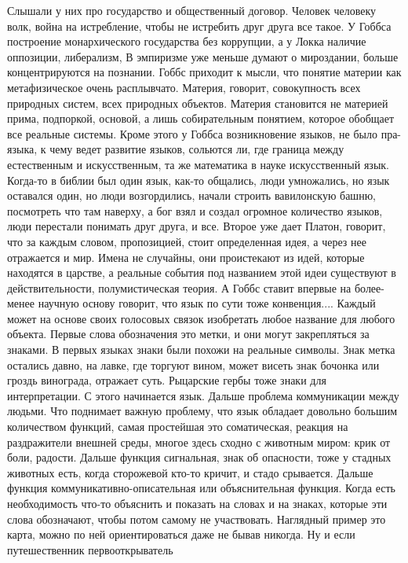 \documentclass[a4paper, 12pt]{article}
\begin{document}
Слышали у них про государство и общественный договор. Человек человеку 
волк, война на истребление, чтобы не истребить друг друга все такое. 
У Гоббса построение монархического государства без коррупции, а у Локка 
наличие оппозиции, либерализм, В эмпиризме уже меньше думают 
о мироздании, больше концентрируются на познании. Гоббс приходит 
к мысли, что понятие материи как метафизическое очень расплывчато. 
Материя, говорит, совокупность всех природных систем, всех природных 
объектов. Материя становится не материей прима, подпоркой, основой, 
а лишь собирательным понятием, которое обобщает все реальные системы. 
Кроме этого у Гоббса возникновение языков, не было пра-языка, к чему 
ведет развитие языков, сольются ли, где граница между естественным 
и искусственным, та же математика в науке искусственный язык. Когда-то 
в библии был один язык, как-то общались, люди умножались, но язык 
оставался один, но люди возгордились, начали строить вавилонскую башню, 
посмотреть что там наверху, а бог взял и создал огромное количество 
языков, люди перестали понимать друг друга, и все. Второе уже дает 
Платон, говорит, что за каждым словом, пропозицией, стоит определенная 
идея, а через нее отражается и мир. Имена не случайны, они проистекают 
из идей, которые находятся в царстве, а реальные события под названием 
этой идеи существуют в действительности, полумистическая теория. А Гоббс 
ставит впервые на более-менее научную основу говорит, что язык по сути 
тоже конвенция.... Каждый может на основе своих голосовых связок 
изобретать любое название для любого объекта. Первые слова обозначения 
это метки, и они могут закрепляться за знаками. В первых языках знаки 
были похожи на реальные символы. Знак метка остались давно, на лавке, 
где торгуют вином, может висеть знак бочонка или гроздь винограда, 
отражает суть. Рыцарские гербы тоже знаки для интерпретации. С этого 
начинается язык. Дальше проблема коммуникации между людьми. Что 
поднимает важную проблему, что язык обладает довольно большим 
количеством функций, самая простейшая это соматическая, реакция на 
раздражители внешней среды, многое здесь сходно с животным миром: крик 
от боли, радости. Дальше функция сигнальная, знак об опасности, тоже 
у стадных животных есть, когда сторожевой кто-то кричит, и стадо 
срывается. Дальше функция коммуникативно-описательная или объяснительная 
функция. Когда есть необходимость что-то объяснить и показать на словах 
и на знаках, которые эти слова обозначают, чтобы потом самому не 
участвовать. Наглядный пример это карта, можно по ней ориентироваться 
даже не бывав никогда. Ну и если путешественник первооткрыватель 
\end{document}
